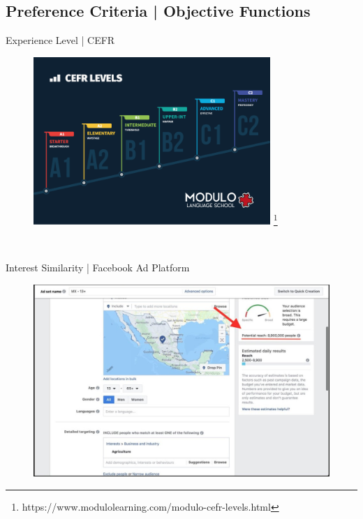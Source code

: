 \documentclass{beamer}
\begin{document}
    \subsection{Preference Criteria | Objective Functions}
    \begin{frame}{Experience Level | CEFR}
        \begin{figure}
            \centering
            \includegraphics[width=0.8\textwidth]{images/cefr-levels.png}
            \footnote{https://www.modulolearning.com/modulo-cefr-levels.html} 
        \end{figure}\\ 
    \end{frame}
    
    \begin{frame}{Interest Similarity | Facebook Ad Platform}
        \begin{figure}
            \includegraphics[width=\textwidth]{images/facebook.png}
        \end{figure}
    \end{frame}
    
\end{document}
